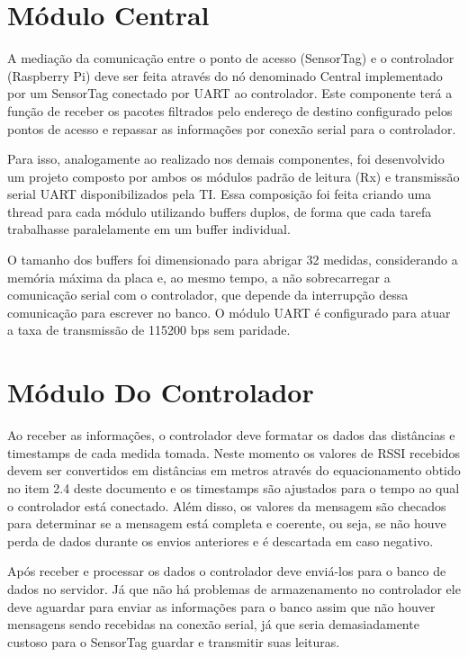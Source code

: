 \section{Módulo Central}

A mediação da comunicação entre o ponto de acesso (SensorTag) e o controlador (Raspberry Pi) deve ser feita através do nó denominado Central implementado por um SensorTag conectado por UART ao controlador.
Este componente terá a função de receber os pacotes filtrados pelo endereço de destino configurado pelos pontos de acesso e repassar as informações por conexão serial para o controlador.

Para isso, analogamente ao realizado nos demais componentes, foi desenvolvido um projeto composto por ambos os módulos padrão de leitura (Rx) e transmissão serial UART disponibilizados pela TI. Essa composição foi feita criando uma thread para cada módulo utilizando buffers duplos, de forma que cada tarefa trabalhasse paralelamente em um buffer individual.

O tamanho dos buffers foi dimensionado para abrigar 32 medidas, considerando a memória máxima da placa e, ao mesmo tempo, a não sobrecarregar a comunicação serial com o controlador, que depende da interrupção dessa comunicação para escrever no banco. O módulo UART é configurado para atuar a taxa de transmissão de 115200 bps sem paridade.

\section{Módulo Do Controlador}

Ao receber as informações, o controlador deve formatar os dados das distâncias e timestamps de cada medida tomada. Neste momento os valores de RSSI recebidos devem ser convertidos em distâncias em metros através do equacionamento obtido no item 2.4 deste documento e os timestamps são ajustados para o tempo ao qual o controlador está conectado. Além disso, os valores da mensagem são checados para determinar se a mensagem está completa e coerente, ou seja, se não houve perda de dados durante os envios anteriores e é descartada em caso negativo.

Após receber e processar os dados o controlador deve enviá-los para o banco de dados no servidor. Já que não há problemas de armazenamento no controlador ele deve aguardar para enviar as informações para o banco assim que não houver mensagens sendo recebidas na conexão serial, já que seria demasiadamente custoso para o SensorTag guardar e transmitir suas leituras.

